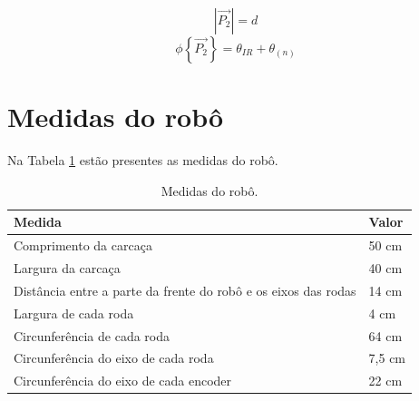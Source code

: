 \begin{equation}
  |\overrightarrow{P_2}| = d
  \label{eq:IR-P_2_modulo}
\end{equation}
\begin{equation}
  \phi \left\{ \overrightarrow{P_2} \right\} = \theta_{IR} + \theta_{(n)}
  \label{eq:IR-P_2_fase}
\end{equation}


\section{Medidas do robô}

Na Tabela \ref{tab:medidas_robo} estão presentes as medidas do robô.

\begin{table}[h]
  \caption{Medidas do robô.}
  \centering
  \begin{tabular}{l|l}
    \toprule
    \textbf{Medida} & \textbf{Valor} \\
    \midrule
    Comprimento da carcaça & 50 cm \\ \hline
    Largura da carcaça & 40 cm \\ \hline
    Distância entre a parte da frente do robô e os eixos das rodas & 14 cm \\ \hline
    Largura de cada roda & 4 cm \\ \hline
    Circunferência de cada roda & 64 cm \\ \hline
    Circunferência do eixo de cada roda & 7,5 cm \\ \hline
    Circunferência do eixo de cada encoder & 22 cm \\ 
    \bottomrule
  \end{tabular}
  \label{tab:medidas_robo}
\end{table}

%


